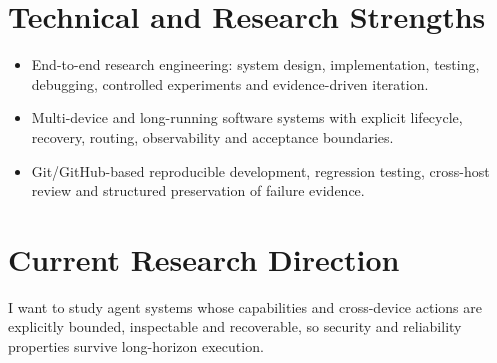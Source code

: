 \documentclass[10pt,a4paper]{article}
\begin{document}
\section{Technical and Research Strengths}
\begin{itemize}
  \item End-to-end research engineering: system design, implementation, testing, debugging, controlled experiments and evidence-driven iteration.
  \item Multi-device and long-running software systems with explicit lifecycle, recovery, routing, observability and acceptance boundaries.
  \item Git/GitHub-based reproducible development, regression testing, cross-host review and structured preservation of failure evidence.
\end{itemize}

\section{Current Research Direction}
I want to study agent systems whose capabilities and cross-device actions are explicitly bounded, inspectable and recoverable, so security and reliability properties survive long-horizon execution.
\end{document}
